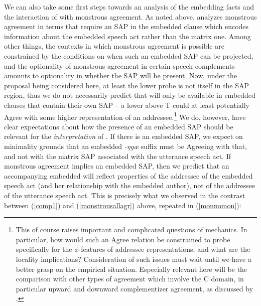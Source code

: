 \documentclass[output=paper, modfonts, nonflat]{langsci/langscibook}
\begin{document}
We can also take some first steps towards an analysis of the embedding
facts and the interaction of \allagr{} with monstrous agreement. As
noted above, \citet{sundaresan:diss} analyzes monstrous agreement in
terms that require an SAP in the embedded clause which encodes
information about the embedded speech act rather than the matrix
one. Among other things, the contexts in which monstrous agreement is
possible are constrained by the conditions on when such an embedded
SAP can be projected, and the optionality of monstrous agreement in
certain speech complements amounts to optionality in whether the SAP
will be present. Now, under the proposal being considered here, at
least the lower \allagr{} probe is not itself in the SAP region, thus
we do not necessarily predict that \allagr{} will only be available in
embedded clauses that contain their own SAP -- a lower \allagr{}
above T could at least potentially Agree with some higher
representation of an addressee.\footnote{This of course raises
  important and complicated questions of mechanics. In particular, how
  would such an Agree relation be constrained to probe specifically
  for the $\phi$-features of addressee representations, and what are
  the locality implications? Consideration of such issues must wait
  until we have a better grasp on the empirical situation. Especially relevant here will be the comparison with other types of agreement which involve the C domain, in particular upward and downward complementizer agreement, as discussed by .} We do,
however, have clear expectations about how the presence of an embedded
SAP should be relevant for the \emph{interpretation} of \allagr. If
there is an embedded SAP, we expect on minimality grounds that an
embedded \textit{-ŋgæ} suffix must be Agreeing with that, and not
with the matrix SAP associated with the utterance speech act. If
monstrous agreement implies an embedded SAP, then we predict that an
accompanying embedded \allagr{} will reflect properties of the
addressee of the embedded speech act (and her relationship with the
embedded author), not of the addressee of the utterance speech
act. This is precisely what we observed in the contrast between
(\ref{comp1}) and (\ref{monstrousallagr}) above, repeated in
(\ref{monnomon}):\largerpage
\end{document}
